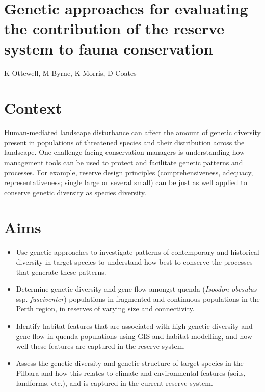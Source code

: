 \documentclass[version=last,
    paper=a4, %
    10pt, %
    usenames,
    dvipsnames,
    oneside, %
    headings=openany, %
    DIV=15 %
]{scrbook}
\begin{document}
\section*{Genetic approaches for evaluating the contribution of the reserve system
to fauna conservation
}

K Ottewell, M Byrne, K Morris, D Coates


\section*{Context}
Human-mediated landscape disturbance can affect the amount of genetic
diversity present in populations of threatened species and their
distribution across the landscape. One challenge facing conservation
managers is understanding how management tools can be used to protect
and facilitate genetic patterns and processes. For example, reserve
design principles (comprehensiveness, adequacy, representativeness;
single large or several small) can be just as well applied to conserve
genetic diversity as species diversity.



\section*{Aims}
\begin{itemize}
\itemsep1pt\parskip0pt
\item
  Use genetic approaches to investigate patterns of contemporary and
  historical diversity in target species to understand how best to
  conserve the processes that generate these patterns.
\item
  Determine genetic diversity and gene flow amongst quenda
  (\emph{Isoodon obesulus} ssp. \emph{fusciventer}) populations in
  fragmented and continuous populations in the Perth region, in reserves
  of varying size and connectivity.
\item
  Identify habitat features that are associated with high genetic
  diversity and gene flow in quenda populations using GIS and habitat
  modelling, and how well these features are captured in the reserve
  system.
\item
  Assess the genetic diversity and genetic structure of target species
  in the Pilbara and how this relates to climate and environmental
  features (soils, landforms, etc.), and is captured in the current
  reserve system.
\end{itemize}
\end{document}
